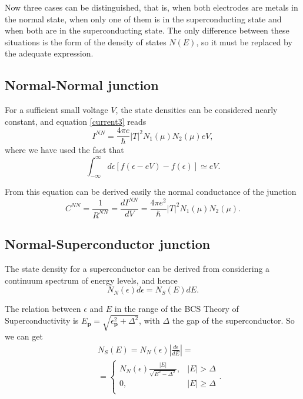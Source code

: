 Now three cases can be distinguished, that is, when both electrodes are metals in the normal state, when only one of them is in the superconducting state and when both are in the superconducting state. The only difference between these situations is the form of the density of states $N(E)$, so it must be replaced by the adequate expression.

\subsection{Normal-Normal junction}
For a sufficient small voltage $V$, the state densities can be considered nearly constant, and equation \eqref{current3} reads
\begin{equation}\label{inn}
I^{NN} = \frac{4\pi e}{\hbar} |T|^2 N_1(\mu)N_2(\mu) eV,
\end{equation}
where we have used the fact that $$ \int_{-\infty}^{\infty}d\epsilon [f(\epsilon-eV)-f(\epsilon)] \simeq eV. $$

From this equation can be derived easily the normal conductance of the junction
\begin{equation}\label{cnn}
C^{NN} = \frac{1}{R^{NN}} = \frac{dI^{NN}}{dV} = \frac{4\pi e^2}{\hbar} |T|^2 N_1(\mu)N_2(\mu).
\end{equation}


\subsection{Normal-Superconductor junction} 
The state density for a superconductor can be derived from considering a continuum spectrum of energy levels, and hence
\begin{equation}
N_N(\epsilon) d\epsilon = N_S(E)dE.
\end{equation}

The relation between $\epsilon$ and $E$ in the range of the BCS Theory of Superconductivity is $E_{\mathbf{p}} = \sqrt{\epsilon_{\mathbf{p}}^2 + \Delta^2}$, with $\Delta$ the gap of the superconductor. So we can get
\begin{eqnarray}\label{ns}
&&N_S(E) = N_N(\epsilon) \left | \frac{d\epsilon}{dE} \right | = 
	\nonumber \\
&& = \left\{ 
\begin{array}{ll} 
N_N(\epsilon)\frac{|E|}{\sqrt{E^2-\Delta^2}},	&	|E| > \Delta 	\\ 
0,								& 	|E| \geq \Delta	\\
\end{array}
\right..
	\nonumber \\
\end{eqnarray}

